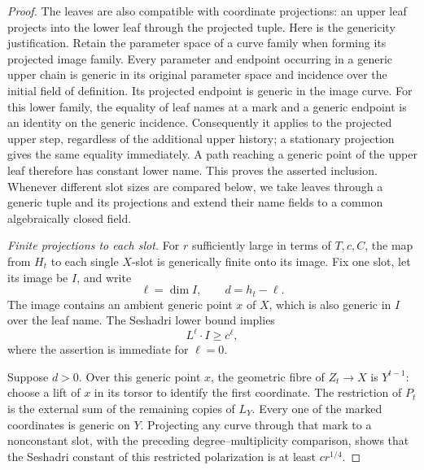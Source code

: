\begin{proof}
The leaves are also compatible with coordinate projections: an upper
leaf projects into the lower leaf through the projected tuple.  Here is
the genericity justification.  Retain the parameter space of a curve
family when forming its projected image family.  Every parameter and
endpoint occurring in a generic upper chain is generic in its original
parameter space and incidence over the initial field of definition.
Its projected endpoint is generic in the image curve.  For this lower
family, the equality of leaf names at a mark and a generic endpoint is
an identity on the generic incidence.  Consequently it applies to the
projected upper step, regardless of the additional upper history;
a stationary projection gives the same equality immediately.  A path
reaching a generic point of the upper leaf therefore has constant lower
name.  This proves the asserted inclusion.  Whenever different slot
sizes are compared below, we take leaves through a generic tuple and
its projections and extend their name fields to a common algebraically
closed field.

\medskip\noindent
\emph{Finite projections to each slot.}
For \(r\) sufficiently large in terms of \(T,c,C\), the map from
\(H_t\) to each single \(X\)-slot is generically finite onto its
image.  Fix one slot, let its image be \(I\), and write
\[
 \ell=\dim I,\qquad d=h_t-\ell.
\]
The image contains an ambient generic point \(x\) of \(X\), which
is also generic in \(I\) over the leaf name.  The Seshadri lower bound
implies
\begin{equation}\label{eq:transport-image-degree}
 L^\ell\cdot I\ge c^\ell,
\end{equation}
where the assertion is immediate for \(\ell=0\).

Suppose \(d>0\).  Over this generic point \(x\), the geometric fibre
of \(Z_t\to X\) is \(Y^{t-1}\): choose a lift of \(x\) in its
torsor to identify the first coordinate.  The restriction of \(P_t\)
is the external sum of the remaining copies of \(L_Y\).  Every one
of the marked coordinates is generic on \(Y\).  Projecting any curve
through that mark to a nonconstant slot, with the preceding
degree--multiplicity comparison, shows that the Seshadri constant of
this restricted polarization is at least \(cr^{1/4}\).


\end{proof}
